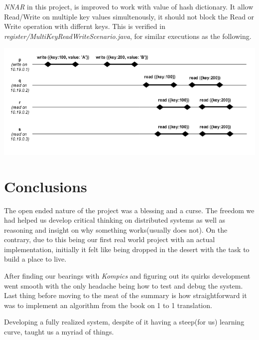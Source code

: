 \documentclass[a4paper, 11pt]{article}
\begin{document}
\textit{NNAR} in this project, is improved to work with value of hash dictionary. It allow Read/Write on multiple key values simultenously, it should not block the Read or Write operation with differnt keys. This is verified in \textit{register/MultiKeyReadWriteScenario.java}, for similar executions as the following.

{\centering\includegraphics[scale = 0.5]{./images/mkey_writes.png}\par}


\section{Conclusions}

The open ended nature of the project was a blessing and a curse. The freedom we had helped us develop critical thinking on distributed systems as well as reasoning and insight on why something works(usually does not). On the contrary, due to  this being our first real world project with an actual implementation, initially it felt like being dropped in the desert with the task to build a place to live. \par

After finding our bearings with \textit{Kompics} and figuring out its quirks development went smooth with the only headache being how to test and debug the system. Last thing before moving to the meat of the summary is how straightforward it was to implement an algorithm from the book on 1 to 1 translation. \par

Developing a fully realized system, despite of it having a steep(for us) learning curve, taught us a myriad of things. 
\end{document}
